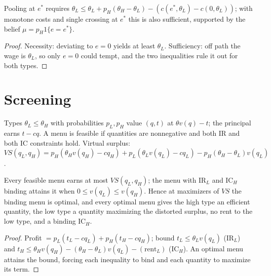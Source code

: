 \begin{theorem}
\label{thm:spence-pool}
\leanok
{}
Pooling at $e^*$ requires $\theta_L \le \theta_L + p_H(\theta_H-\theta_L) - (c(e^*,\theta_L) - c(0,\theta_L))$; with monotone costs and
single crossing at $e^*$ this is also sufficient, supported by the belief $\mu = p_H 1\{e = e^*\}$.
\end{theorem}
\begin{proof}
\leanok
Necessity: deviating to $e=0$ yields at least $\theta_L$. Sufficiency: off path the wage is $\theta_L$, so only $e=0$
could tempt, and the two inequalities rule it out for both types.
\end{proof}

\section{Screening}
\label{sec:screening}

\begin{definition}
\label{def:screening}
\leanok
Types $\theta_L \le \theta_H$ with probabilities $p_L, p_H$ value $(q,t)$ at $\theta v(q) - t$; the principal earns
$t - cq$. A menu is feasible if quantities are nonnegative and both IR and both IC constraints hold.
Virtual surplus: $VS(q_L,q_H) = p_H(\theta_H v(q_H) - cq_H) + p_L(\theta_L v(q_L) - cq_L) - p_H(\theta_H-\theta_L)v(q_L)$.
\end{definition}

\begin{theorem}
\label{thm:screening}
\leanok
{}
Every feasible menu earns at most $VS(q_L,q_H)$; the menu with IR$_L$ and IC$_H$ binding attains it when
$0 \le v(q_L) \le v(q_H)$. Hence at maximizers of $VS$ the binding menu is optimal, and every optimal menu
gives the high type an efficient quantity, the low type a quantity maximizing the distorted surplus,
no rent to the low type, and a binding IC$_H$.
\end{theorem}
\begin{proof}
\leanok
Profit $= p_L(t_L - cq_L) + p_H(t_H - cq_H)$; bound $t_L \le \theta_L v(q_L)$ (IR$_L$) and
$t_H \le \theta_H v(q_H) - (\theta_H - \theta_L) v(q_L) - (\text{rent}_L)$ (IC$_H$). An optimal menu attains the
bound, forcing each inequality to bind and each quantity to maximize its term.
\end{proof}

